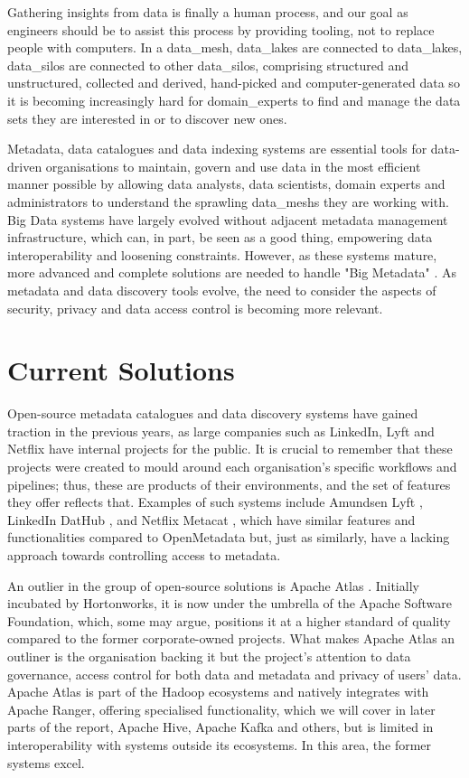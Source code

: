 Gathering insights from data is finally a human process, and our goal as engineers should be to assist this process by providing tooling, not to replace people with computers. In a \gls{data_mesh}, \glspl{data_lake} are connected to \glspl{data_lake}, \glspl{data_silo} are connected to other \glspl{data_silo}, comprising structured and unstructured, collected and derived, hand-picked and computer-generated data so it is becoming increasingly hard for \glspl{domain_expert} to find and manage the data sets they are interested in or to discover new ones.

Metadata, data catalogues and data indexing systems are essential tools for data-driven organisations to maintain, govern and use data in the most efficient manner possible by allowing data analysts, data scientists, domain experts and administrators to understand the sprawling \glspl{data_mesh} they are working with. Big Data systems have largely evolved without adjacent metadata management infrastructure, which can, in part, be seen as a good thing, empowering data interoperability and loosening constraints. However, as these systems mature, more advanced and complete solutions are needed to handle "Big Metadata" \cite{bigMetadataSmith2014}. As metadata and data discovery tools evolve, the need to consider the aspects of security, privacy and data access control is becoming more relevant.

\section{Current Solutions}

Open-source metadata catalogues and data discovery systems have gained traction in the previous years, as large companies such as LinkedIn, Lyft and Netflix have internal projects for the public. It is crucial to remember that these projects were created to mould around each organisation's specific workflows and pipelines; thus, these are products of their environments, and the set of features they offer reflects that. Examples of such systems include Amundsen Lyft \cite{amundsenLyftGrover2019}, LinkedIn DatHub \cite{dataHubLinkedinLan2019}, and Netflix Metacat \cite{metacatNetflixMajumdar2018}, which have similar features and functionalities compared to OpenMetadata but, just as similarly, have a lacking approach towards controlling access to metadata.

An outlier in the group of open-source solutions is Apache Atlas \cite{apacheAtlasTech}. Initially incubated by Hortonworks, it is now under the umbrella of the Apache Software Foundation, which, some may argue, positions it at a higher standard of quality compared to the former corporate-owned projects. What makes Apache Atlas an outliner is the organisation backing it but the project's attention to data governance, access control for both data and metadata and privacy of users' data. Apache Atlas is part of the Hadoop ecosystems and natively integrates with Apache Ranger, offering specialised functionality, which we will cover in later parts of the report, Apache Hive, Apache Kafka and others, but is limited in interoperability with systems outside its ecosystems. In this area, the former systems excel.

